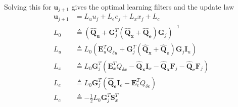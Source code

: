 \documentclass[landscape]{article}
\begin{document}
Solving this for $\mathbf{u}_{j+1}$ gives the optimal learning filters and the update law
\begin{align}
\mathbf{u}_{j+1} & = L_u u_j + L_e e_j + L_x x_j + L_c\\
L_0 & \triangleq \left(\mathbf{\hat{Q}_u} + \mathbf{G}_j^T \left(\mathbf{\hat{Q}_x} + \mathbf{\hat{Q}_e} \right)\mathbf{G}_j \right)^{-1}\\
L_u & \triangleq L_0\left(\mathbf{E}_u^T Q_{\delta u} + \mathbf{G}_j^T \left(\mathbf{\hat{Q}_x} +  \mathbf{\hat{Q}_e} \right) \mathbf{G}_j \mathbf{I}_u \right)\\
L_x & \triangleq L_0\mathbf{G}_j^T\left(\mathbf{E}_x^T Q_{\delta x} - \mathbf{\hat{Q}_x} \mathbf{I}_x  - \mathbf{\hat{Q}_x} \mathbf{F}_j  - \mathbf{\hat{Q}_e} \mathbf{F}_j \right)\\
L_e & \triangleq L_0 \mathbf{G}_j^T \left( \mathbf{\hat{Q}_e} \mathbf{I}_e - \mathbf{E}_e^T Q_{\delta e} \right)\\
L_c & \triangleq -\frac{1}{2}L_0\mathbf{G}_j^T\mathbf{S}_x^T
\end{align}
\end{document}
